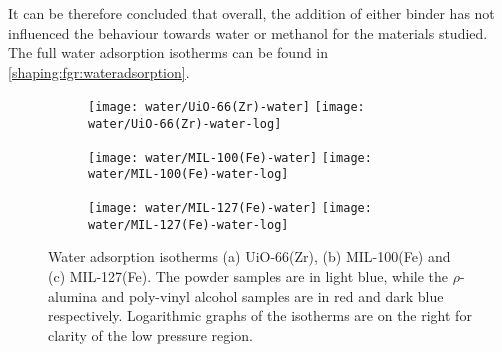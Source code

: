 It can be therefore concluded that overall, the addition of either 
binder has not influenced the behaviour towards water or 
methanol for the materials studied. The full water adsorption isotherms
can be found in \autoref{shaping:fgr:wateradsorption}.

\begin{figure}[p!]
    \centering

    \begin{subfigure}{\linewidth}
        \centering
        \parbox{0.1\linewidth}{\caption{}\label{shaping:fgr:wateruio66}}%
        \texttt{[image: water/UiO-66(Zr)-water]}%
        \texttt{[image: water/UiO-66(Zr)-water-log]}%
    \end{subfigure}

    \begin{subfigure}{\linewidth}
        \centering
        \parbox{0.1\linewidth}{\caption{}\label{shaping:fgr:watermil100}}%
        \texttt{[image: water/MIL-100(Fe)-water]}%
        \texttt{[image: water/MIL-100(Fe)-water-log]}%
    \end{subfigure}

    \begin{subfigure}{\linewidth}
        \centering
        \parbox{0.1\linewidth}{\caption{}\label{shaping:fgr:watermil127}}%
        \texttt{[image: water/MIL-127(Fe)-water]}%
        \texttt{[image: water/MIL-127(Fe)-water-log]}%
    \end{subfigure}
    
    \caption{Water adsorption isotherms (a) UiO-66(Zr), 
    (b) MIL-100(Fe) and (c) MIL-127(Fe). The powder samples are in light
    blue, while the \(\rho\)-alumina and poly-vinyl alcohol samples are in red
    and dark blue respectively. Logarithmic graphs of the isotherms are
    on the right for clarity of the low
    pressure region.}%
    \label{shaping:fgr:wateradsorption}
\end{figure}


